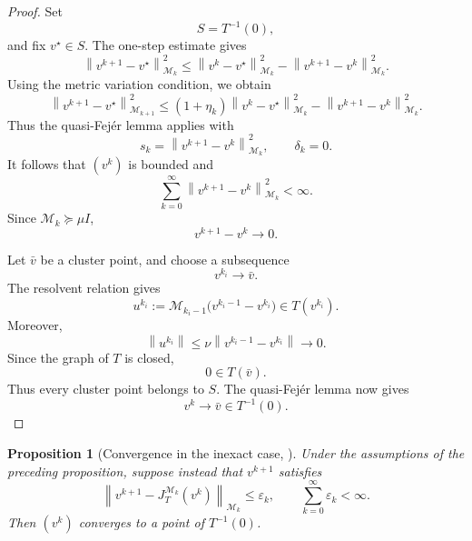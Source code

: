 \documentclass[a4paper,11pt]{book}
\theoremstyle{plain}
\newtheorem{proposition}[theorem]{Proposition}
\theoremstyle{definition}
\theoremstyle{remark}
\numberwithin{equation}{chapter}
\numberwithin{algorithm}{chapter}
\newcommand{\norm}[1]{\left\|#1\right\|}
\begin{document}
	\begin{proof}
		Set
		\[
		S=T^{-1}(0),
		\]
		and fix \(v^\star\in S\). The one-step estimate gives
		\[
		\norm{v^{k+1}-v^\star}_{\mathcal M_k}^2
		\leq
		\norm{v^k-v^\star}_{\mathcal M_k}^2
		-
		\norm{v^{k+1}-v^k}_{\mathcal M_k}^2.
		\]
		Using the metric variation condition, we obtain
		\[
		\norm{v^{k+1}-v^\star}_{\mathcal M_{k+1}}^2
		\leq
		(1+\eta_k)
		\norm{v^k-v^\star}_{\mathcal M_k}^2
		-
		\norm{v^{k+1}-v^k}_{\mathcal M_k}^2.
		\]
		Thus the quasi-Fejér lemma applies with
		\[
		s_k=\norm{v^{k+1}-v^k}_{\mathcal M_k}^2,
		\qquad
		\delta_k=0.
		\]
		It follows that \((v^k)\) is bounded and
		\[
		\sum_{k=0}^{\infty}
		\norm{v^{k+1}-v^k}_{\mathcal M_k}^2
		<\infty.
		\]
		Since \(\mathcal M_k\succeq\mu I\),
		\[
		v^{k+1}-v^k\longrightarrow0.
		\]
		
		Let \(\bar v\) be a cluster point, and choose a subsequence
		\[
		v^{k_i}\longrightarrow\bar v.
		\]
		The resolvent relation gives
		\[
		u^{k_i}
		:=
		\mathcal M_{k_i-1}
		\bigl(v^{k_i-1}-v^{k_i}\bigr)
		\in T(v^{k_i}).
		\]
		Moreover,
		\[
		\norm{u^{k_i}}
		\leq
		\nu\norm{v^{k_i-1}-v^{k_i}}
		\longrightarrow0.
		\]
		Since the graph of \(T\) is closed,
		\[
		0\in T(\bar v).
		\]
		Thus every cluster point belongs to \(S\). The quasi-Fejér lemma now gives
		\[
		v^k\longrightarrow\bar v\in T^{-1}(0).
		\]
	\end{proof}
	
	\begin{proposition}[Convergence in the inexact case, \cite{Rockafellar1976a}]
		Under the assumptions of the preceding proposition, suppose instead that
		\(v^{k+1}\) satisfies
		\begin{equation}
			\norm{
				v^{k+1}-J_T^{\mathcal M_k}(v^k)
			}_{\mathcal M_k}
			\leq\varepsilon_k,
			\qquad
			\sum_{k=0}^{\infty}\varepsilon_k<\infty.
			\label{eq:inexact-resolvent-condition}
		\end{equation}
		Then \((v^k)\) converges to a point of \(T^{-1}(0)\).
	\end{proposition}
	
\end{document}
